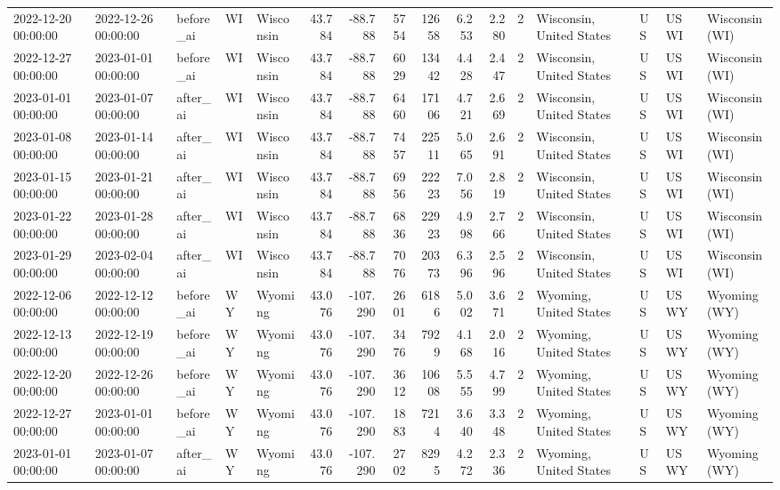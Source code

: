 \begin{tabular}{lllllrrrrrrlllll}
2022-12-20 00:00:00 & 2022-12-26 00:00:00 & before\_ai & WI & Wisconsin & 43.784 & -88.788 & 5754 & 12658 & 6.253 & 2.280 & 2 & Wisconsin, United States & US & USWI & Wisconsin (WI) \\
2022-12-27 00:00:00 & 2023-01-01 00:00:00 & before\_ai & WI & Wisconsin & 43.784 & -88.788 & 6029 & 13442 & 4.428 & 2.447 & 2 & Wisconsin, United States & US & USWI & Wisconsin (WI) \\
2023-01-01 00:00:00 & 2023-01-07 00:00:00 & after\_ai & WI & Wisconsin & 43.784 & -88.788 & 6460 & 17106 & 4.721 & 2.669 & 2 & Wisconsin, United States & US & USWI & Wisconsin (WI) \\
2023-01-08 00:00:00 & 2023-01-14 00:00:00 & after\_ai & WI & Wisconsin & 43.784 & -88.788 & 7457 & 22511 & 5.065 & 2.691 & 2 & Wisconsin, United States & US & USWI & Wisconsin (WI) \\
2023-01-15 00:00:00 & 2023-01-21 00:00:00 & after\_ai & WI & Wisconsin & 43.784 & -88.788 & 6956 & 22223 & 7.056 & 2.819 & 2 & Wisconsin, United States & US & USWI & Wisconsin (WI) \\
2023-01-22 00:00:00 & 2023-01-28 00:00:00 & after\_ai & WI & Wisconsin & 43.784 & -88.788 & 6836 & 22923 & 4.998 & 2.766 & 2 & Wisconsin, United States & US & USWI & Wisconsin (WI) \\
2023-01-29 00:00:00 & 2023-02-04 00:00:00 & after\_ai & WI & Wisconsin & 43.784 & -88.788 & 7076 & 20373 & 6.396 & 2.596 & 2 & Wisconsin, United States & US & USWI & Wisconsin (WI) \\
2022-12-06 00:00:00 & 2022-12-12 00:00:00 & before\_ai & WY & Wyoming & 43.076 & -107.290 & 2601 & 6186 & 5.002 & 3.671 & 2 & Wyoming, United States & US & USWY & Wyoming (WY) \\
2022-12-13 00:00:00 & 2022-12-19 00:00:00 & before\_ai & WY & Wyoming & 43.076 & -107.290 & 3476 & 7929 & 4.168 & 2.016 & 2 & Wyoming, United States & US & USWY & Wyoming (WY) \\
2022-12-20 00:00:00 & 2022-12-26 00:00:00 & before\_ai & WY & Wyoming & 43.076 & -107.290 & 3612 & 10608 & 5.555 & 4.799 & 2 & Wyoming, United States & US & USWY & Wyoming (WY) \\
2022-12-27 00:00:00 & 2023-01-01 00:00:00 & before\_ai & WY & Wyoming & 43.076 & -107.290 & 1883 & 7214 & 3.640 & 3.348 & 2 & Wyoming, United States & US & USWY & Wyoming (WY) \\
2023-01-01 00:00:00 & 2023-01-07 00:00:00 & after\_ai & WY & Wyoming & 43.076 & -107.290 & 2702 & 8295 & 4.272 & 2.336 & 2 & Wyoming, United States & US & USWY & Wyoming (WY) \\

\end{tabular}

